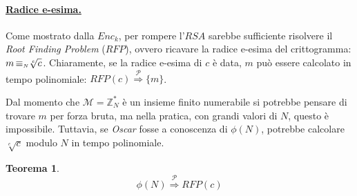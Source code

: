 \documentclass[twoside,symmetric,justified,openany,nobib]{tufte-book}
\newcommand{\OS}{\textit{Oscar}\xspace}
\newtheorem{thm}{Teorema}
\begin{document}
\paragraph{\normalfont\textbf{\underline{Radice e-esima.}}} Come mostrato dalla $Enc_k$, per rompere l'$RSA$ sarebbe sufficiente risolvere il \textit{Root Finding Problem} ($RFP$), ovvero ricavare la radice e-esima del crittogramma: $m\,{\equiv}_{\text{\tiny $N$}}\sqrt[e]{c}$. Chiaramente, se la radice e-esima di $c$ è data, $m$ può essere calcolato in tempo polinomiale: $RFP(c)\overset{\mathcal{P}}{\Rightarrow} \{m\}$.

Dal momento che $\mathcal{M}{=}\mathbb{Z}^{*}_{N}$ è un insieme finito numerabile si potrebbe pensare di trovare $m$ per forza bruta, ma nella pratica, con grandi valori di $N$, questo è impossibile. Tuttavia, se \OS fosse a conoscenza di $\phi(N)$, potrebbe calcolare $\sqrt[e]{c}$ modulo $N$ in tempo polinomiale.

\begin{thm}
  \begin{equation}
    \phi(N)\overset{\mathcal{P}}{\Longrightarrow} RFP(c)
  \end{equation}
\end{thm}
\end{document}
